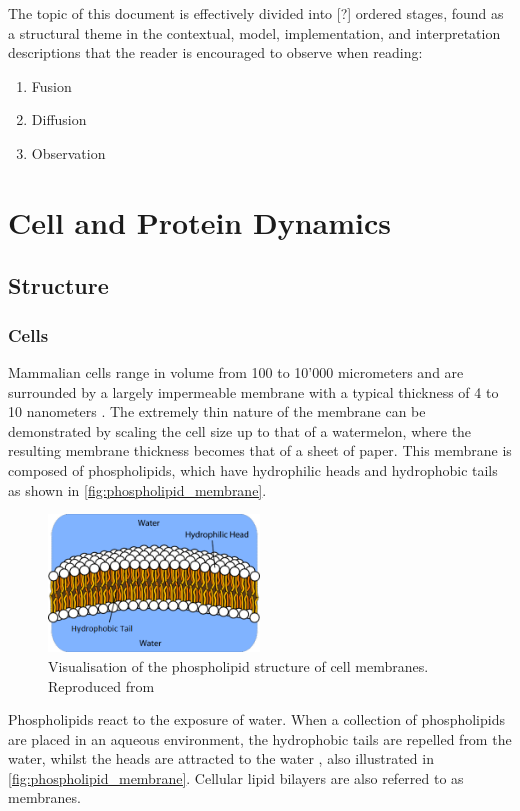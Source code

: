 \documentclass{report}
\begin{document}
The topic of this document is effectively divided into [?] ordered stages, found as a structural theme in the contextual, model, implementation, and interpretation descriptions that the reader is encouraged to observe when reading:
\begin{enumerate}
	\item Fusion
	\item Diffusion
	\item Observation
\end{enumerate}

\part{Cell and Protein Dynamics}
\chapter{Structure}
\section{Cells}
Mammalian cells range in volume from 100 to 10'000 micrometers and are surrounded by a largely impermeable membrane with a typical thickness of 4 to 10 nanometers \cite{milo2010bionumbers}. The extremely thin nature of the membrane can be demonstrated by scaling the cell size up to that of a watermelon, where the resulting membrane thickness becomes that of a sheet of paper. This membrane is composed of phospholipids, which have hydrophilic heads and hydrophobic tails as shown in \autoref{fig:phospholipid_membrane}.

\begin{figure}
	\centering
	\includegraphics[width = 0.5\textwidth]{phospholipid_membrane.png}
	\caption{Visualisation of the phospholipid structure of cell membranes. Reproduced from \cite{soult2020phospholipids}}
	\label{fig:phospholipid_membrane}
\end{figure}

Phospholipids react to the exposure of water. When a collection of phospholipids are placed in an aqueous environment, the hydrophobic tails are repelled from the water, whilst the heads are attracted to the water \cite{yeagle1978phospholipid}, also illustrated in \autoref{fig:phospholipid_membrane}. Cellular lipid bilayers are also referred to as membranes.
\end{document}
